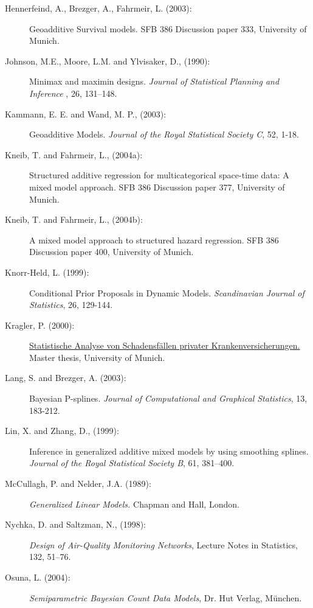 \documentclass[11pt,a4paper,twoside]{bayesxarticle}
\begin{document}
\begin{description}
\item[Hennerfeind, A., Brezger, A., Fahrmeir, L. (2003):]
Geoadditive Survival models. SFB 386 Discussion paper 333,
University of Munich.

\item[Johnson, M.E., Moore, L.M. and
Ylvisaker, D., (1990):] Minimax and maximin designs. {\it Journal of Statistical Planning and Inference}
, 26, 131--148.

\item[Kammann, E. E. and Wand, M. P., (2003):] Geoadditive Models. {\it Journal of the Royal
Statistical Society C}, 52, 1-18.

\item[Kneib, T. and Fahrmeir, L., (2004a):] Structured additive
regression for multicategorical space-time data: A mixed model
approach. SFB 386 Discussion paper 377, University of Munich.

\item[Kneib, T. and Fahrmeir, L., (2004b):] A mixed model approach
to structured hazard regression. SFB 386 Discussion paper 400,
University of Munich.

\item[Knorr-Held, L. (1999):] Conditional Prior Proposals in
Dynamic Models. {\em Scandinavian Journal of Statistics}, 26,
129-144.

\item[Kragler, P. (2000):] \href{http://www.scor.fr/us/2_laureat.asp?pays=2}
{Statistische Analyse von Schadensf\"allen privater
Krankenversicherungen.} Master thesis, University of Munich.


\item[Lang, S. and Brezger, A. (2003):] Bayesian P-splines. {\it
Journal of Computational and Graphical Statistics}, 13, 183-212.

\item[Lin, X. and Zhang, D., (1999):]
Inference in generalized additive mixed models by using smoothing
splines. {\it Journal of the Royal Statistical Society B}, 61,
381--400.

\item[McCullagh, P. and Nelder, J.A. (1989):] {\em Generalized Linear Models.} Chapman and Hall, London.

\item[Nychka, D. and Saltzman, N., (1998):]
{\it Design of Air-Quality Monitoring Networks},
Lecture Notes in Statistics, 132, 51--76.

\item[Osuna, L. (2004):] {\it Semiparametric Bayesian Count Data
Models}, Dr. Hut Verlag, M\"{u}nchen.


\end{description}
\end{document}
